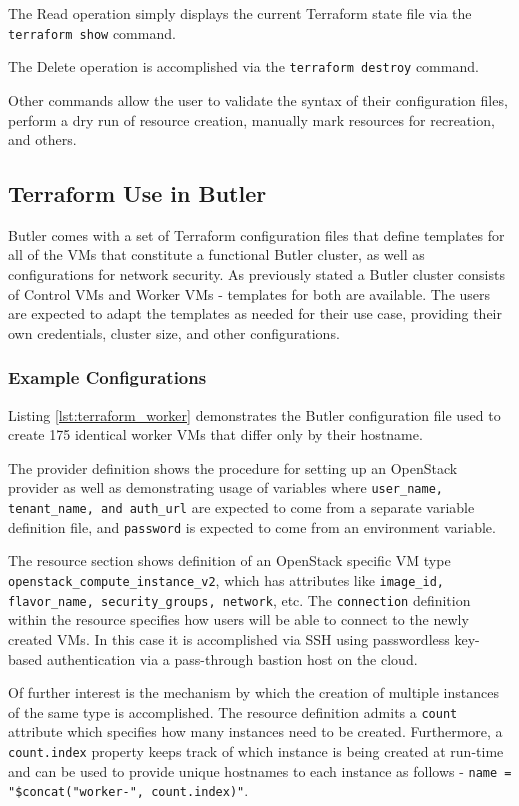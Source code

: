 The Read operation simply displays the current Terraform state file via the \texttt{terraform show} command.

The Delete operation is accomplished via the \texttt{terraform destroy} command.

Other commands allow the user to validate the syntax of their configuration files, perform a dry run of resource creation, manually mark resources for recreation, and others.

\subsection {Terraform Use in Butler}

Butler comes with a set of Terraform configuration files that define templates for all of the VMs that constitute a functional Butler cluster, as well as configurations for network security. As previously stated a Butler cluster consists of Control VMs and Worker VMs - templates for both are available. The users are expected to adapt the templates as needed for their use case, providing their own credentials, cluster size, and other configurations.

\subsubsection {Example Configurations}


Listing \ref{lst:terraform_worker} demonstrates the Butler configuration file used to create 175 identical worker VMs that differ only by their hostname. 

The provider definition shows the procedure for setting up an OpenStack provider as well as demonstrating usage of variables where \texttt{user_name, tenant_name, and auth_url} are expected to come from a separate variable definition file, and  \texttt{password} is expected to come from an environment variable. 

The resource section shows definition of an OpenStack specific VM type \texttt{openstack_compute_instance_v2}, which has attributes like 
\texttt{image_id, flavor_name, security_groups, network}, etc. The  \texttt{connection} definition within the resource specifies how users will be able to connect to the newly created VMs. In this case it is accomplished via SSH using passwordless key-based authentication via a pass-through bastion host on the cloud.

Of further interest is the mechanism by which the creation of multiple instances of the same type is accomplished. The resource definition admits a \texttt{count} attribute which specifies how many instances need to be created. Furthermore, a \texttt{count.index} property keeps track of which instance is being created at run-time and can be used to provide unique hostnames to each instance as follows -   \texttt{name = "\${concat("worker-", count.index)}"}.

